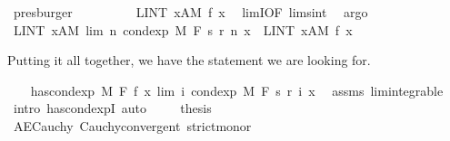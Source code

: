\begin{isabellebody}
\ presburger\isanewline
\ \ \ \ \isamarkupfalse%
\ \isamarkupfalse%
\ {\isachardoublequoteopen}{\isachardot}{\kern0pt}{\isachardot}{\kern0pt}{\isachardot}{\kern0pt}\ {\isacharequal}{\kern0pt}\ LINT\ x{\isacharcolon}{\kern0pt}A{\isacharbar}{\kern0pt}M{\isachardot}{\kern0pt}\ f\ x{\isachardoublequoteclose}\ \isamarkupfalse%
\ limI{\isacharbrackleft}{\kern0pt}OF\ lim{\isacharunderscore}{\kern0pt}s{\isacharunderscore}{\kern0pt}int{\isacharbrackright}{\kern0pt}\ \isamarkupfalse%
\ argo\isanewline
\ \ \ \ \isamarkupfalse%
\ \isamarkupfalse%
\ {\isachardoublequoteopen}LINT\ x{\isacharcolon}{\kern0pt}A{\isacharbar}{\kern0pt}M{\isachardot}{\kern0pt}\ lim\ {\isacharparenleft}{\kern0pt}{\isasymlambda}n{\isachardot}{\kern0pt}\ cond{\isacharunderscore}{\kern0pt}exp\ M\ F\ {\isacharparenleft}{\kern0pt}s\ {\isacharparenleft}{\kern0pt}r\ n{\isacharparenright}{\kern0pt}{\isacharparenright}{\kern0pt}\ x{\isacharparenright}{\kern0pt}\ {\isacharequal}{\kern0pt}\ LINT\ x{\isacharcolon}{\kern0pt}A{\isacharbar}{\kern0pt}M{\isachardot}{\kern0pt}\ f\ x{\isachardoublequoteclose}\ \isacommand{{\isachardot}{\kern0pt}}\isamarkupfalse%
\isanewline
\ \ \isacommand{{\isacharbraceright}{\kern0pt}}\isamarkupfalse%
%
\begin{isamarkuptext}%
Putting it all together, we have the statement we are looking for.%
\end{isamarkuptext}\isamarkuptrue%
\ \ \isamarkupfalse%
\ {\isachardoublequoteopen}has{\isacharunderscore}{\kern0pt}cond{\isacharunderscore}{\kern0pt}exp\ M\ F\ f\ {\isacharparenleft}{\kern0pt}{\isasymlambda}x{\isachardot}{\kern0pt}\ lim\ {\isacharparenleft}{\kern0pt}{\isasymlambda}i{\isachardot}{\kern0pt}\ cond{\isacharunderscore}{\kern0pt}exp\ M\ F\ {\isacharparenleft}{\kern0pt}s\ {\isacharparenleft}{\kern0pt}r\ i{\isacharparenright}{\kern0pt}{\isacharparenright}{\kern0pt}\ x{\isacharparenright}{\kern0pt}{\isacharparenright}{\kern0pt}{\isachardoublequoteclose}\ \isamarkupfalse%
\ assms{\isacharparenleft}{\kern0pt}{}{\isacharparenright}{\kern0pt}\ lim{\isacharunderscore}{\kern0pt}integrable\ \isamarkupfalse%
\ {\isacharparenleft}{\kern0pt}intro\ has{\isacharunderscore}{\kern0pt}cond{\isacharunderscore}{\kern0pt}expI{\isacharprime}{\kern0pt}{\isacharcomma}{\kern0pt}\ auto{\isacharparenright}{\kern0pt}\ \isanewline
\ \ \isamarkupfalse%
\ thesis\ \isamarkupfalse%
\ AE{\isacharunderscore}{\kern0pt}Cauchy\ Cauchy{\isacharunderscore}{\kern0pt}convergent\ strict{\isacharunderscore}{\kern0pt}mono{\isacharunderscore}{\kern0pt}r\ \isamarkupfalse%

\end{isabellebody}
